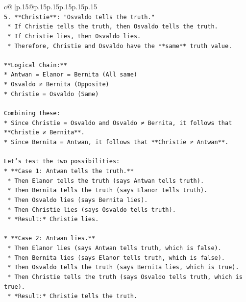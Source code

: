 \documentclass{article}
\begin{document}
{\begin{supertabular}{c@{$\;$}|p{.15\linewidth}@{}p{.15\linewidth}p{.15\linewidth}p{.15\linewidth}p{.15\linewidth}p{.15\linewidth}}
{{{\\ 
\texttt{5.  **Christie**: "Osvaldo tells the truth."} \\
\texttt{    *   If Christie tells the truth, then Osvaldo tells the truth.} \\
\texttt{    *   If Christie lies, then Osvaldo lies.} \\
\texttt{    *   Therefore, Christie and Osvaldo have the **same** truth value.} \\
\\ 
\texttt{**Logical Chain:**} \\
\texttt{*   Antwan = Elanor = Bernita (All same)} \\
\texttt{*   Osvaldo ≠ Bernita (Opposite)} \\
\texttt{*   Christie = Osvaldo (Same)} \\
\\ 
\texttt{Combining these:} \\
\texttt{*   Since Christie = Osvaldo and Osvaldo ≠ Bernita, it follows that **Christie ≠ Bernita**.} \\
\texttt{*   Since Bernita = Antwan, it follows that **Christie ≠ Antwan**.} \\
\\ 
\texttt{Let's test the two possibilities:} \\
\texttt{*   **Case 1: Antwan tells the truth.**} \\
\texttt{    *   Then Elanor tells the truth (says Antwan tells truth).} \\
\texttt{    *   Then Bernita tells the truth (says Elanor tells truth).} \\
\texttt{    *   Then Osvaldo lies (says Bernita lies).} \\
\texttt{    *   Then Christie lies (says Osvaldo tells truth).} \\
\texttt{    *   *Result:* Christie lies.} \\
\\ 
\texttt{*   **Case 2: Antwan lies.**} \\
\texttt{    *   Then Elanor lies (says Antwan tells truth, which is false).} \\
\texttt{    *   Then Bernita lies (says Elanor tells truth, which is false).} \\
\texttt{    *   Then Osvaldo tells the truth (says Bernita lies, which is true).} \\
\texttt{    *   Then Christie tells the truth (says Osvaldo tells truth, which is true).} \\
\texttt{    *   *Result:* Christie tells the truth.} \\
}}}
\end{supertabular}}
\end{document}
